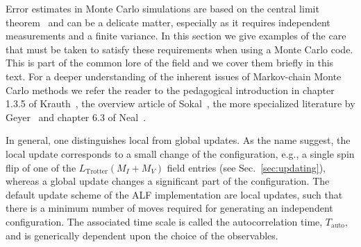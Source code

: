 %

Error estimates in Monte Carlo simulations are based on the central limit theorem~\cite{Negele} and can be a delicate matter, especially as it requires independent measurements and a finite variance. In this section we give examples of the care that must be taken to satisfy these requirements when using a Monte Carlo code. This is part of the common lore of the field and we cover them briefly in this text.
For a deeper understanding of the inherent issues of Markov-chain Monte Carlo methods we refer the reader to the pedagogical introduction in chapter 1.3.5 of Krauth~\cite{Krauth2006}, the overview article of Sokal~\cite{Sokal89},  the more specialized literature by Geyer~\cite{Geyer1992} and chapter 6.3 of Neal~\cite{neal1993}.

In general, one distinguishes local from global updates. As the name suggest, the local update corresponds to a small change of the configuration, e.g., a single spin flip of one of the $L_{\mathrm{Trotter}}(M_I+M_V)$ field entries (see Sec.~\ref{sec:updating}), whereas a global update changes a significant part of the configuration. The default update scheme of the ALF implementation are local updates, such that there is a minimum number of moves required for generating an independent configuration. The associated time scale is called  the autocorrelation time, $T_\mathrm{auto}$, and is generically dependent upon the choice of the observables. 

